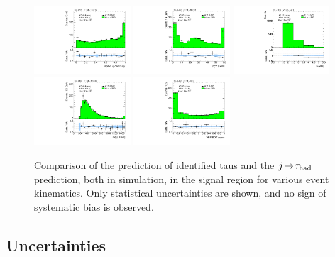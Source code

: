 \begin{figure}[tp]
  \includegraphics[width=0.32\textwidth]{figures/analysis/vbf-MCXSR/lep-eta-centrality}
  \includegraphics[width=0.32\textwidth]{figures/analysis/vbf-MCXSR/system-pt}
  \includegraphics[width=0.32\textwidth]{figures/analysis/vbf-MCXSR/n-jets30}
  \includegraphics[width=0.32\textwidth]{figures/analysis/vbf-MCXSR/dijet-m-high}
  \includegraphics[width=0.32\textwidth]{figures/analysis/vbf-MCXSR/BDTEve-VBF}
  \caption{Comparison of the prediction of identified taus and the $j\!\rightarrow\!\tau_\text{had}$ prediction, both in simulation, in the signal region for various event kinematics. Only statistical uncertainties are shown, and no sign of systematic bias is observed.}
  \label{fig:backgrounds-MCXSR-jets}
\end{figure}

\clearpage

\subsection{Uncertainties}

